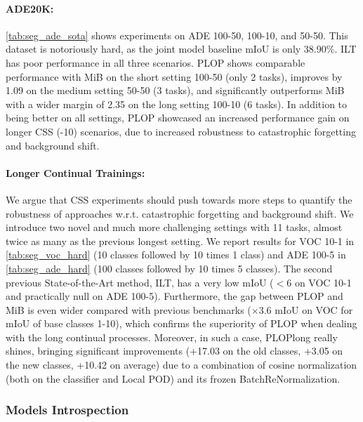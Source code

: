 \paragraph{ADE20K:} \autoref{tab:seg_ade_sota} shows experiments on ADE 100-50, 100-10, and
50-50. This dataset is notoriously hard, as the joint model baseline \ac{mIoU} is only 38.90\%. ILT
has poor performance in all three scenarios. PLOP shows comparable performance with MiB on the short
setting 100-50 (only 2 tasks), improves by 1.09 \pp on the medium setting 50-50 (3 tasks),
and significantly outperforms MiB with a wider margin of 2.35 \pp on the long setting
100-10 (6 tasks). In addition to being better on all settings, PLOP showcased an increased
performance gain on longer \ac{CSS} (-10) scenarios, due to increased robustness to catastrophic
forgetting and background shift.


\paragraph{Longer Continual Trainings:}We argue that \ac{CSS} experiments should push towards
more steps
\citep{wortsman2020supermasks,lomonaco2020ar1,douillard2020podnet,castro2018end_to_end_inc_learn} to
quantify the robustness of approaches w.r.t. catastrophic forgetting and background shift. We
introduce two novel and much more challenging settings with 11 tasks, almost twice as many as the
previous longest setting. We report results for VOC 10-1 in \autoref{tab:seg_voc_hard} (10 classes
followed by 10 times 1 class) and ADE 100-5 in \autoref{tab:seg_ade_hard} (100 classes followed by
10 times 5 classes). The second previous State-of-the-Art method, ILT, has a very low \ac{mIoU}
($<6$ on VOC 10-1 and practically null on ADE 100-5). Furthermore, the gap between PLOP and MiB is
even wider compared with previous benchmarks (\eg $\times$3.6 \ac{mIoU} on VOC for \ac{mIoU} of
base classes 1-10), which confirms the superiority of PLOP when dealing with the long continual
processes. Moreover, in such a case, PLOPlong really shines, bringing significant improvements
(+17.03 \pp on the old classes, +3.05 \pp on the new classes, +10.42 \pp on average) due to
a combination of cosine normalization (both on the classifier and Local POD) and its frozen
BatchReNormalization.

\subsubsection{Models Introspection}

